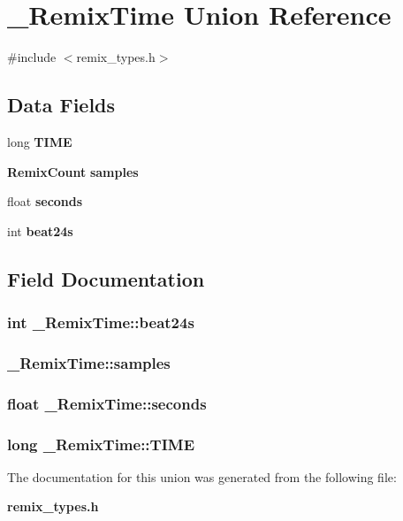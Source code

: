 \section{\_\-RemixTime Union Reference}
\label{union__RemixTime}


{\ttfamily \#include $<$remix\_\-types.h$>$}

\subsection*{Data Fields}
\begin{DoxyCompactItemize}
\item 
long {\bf TIME}
\item 
{\bf RemixCount} {\bf samples}
\item 
float {\bf seconds}
\item 
int {\bf beat24s}
\end{DoxyCompactItemize}


\subsection{Field Documentation}
\subsubsection[{beat24s}]{\setlength{\rightskip}{0pt plus 5cm}int {\bf \_\-RemixTime::beat24s}}\label{union__RemixTime_aac9cb0c3b6dfdb8ce53694543a690ee7}
\subsubsection[{samples}]{ {\bf \_\-RemixTime::samples}}\label{union__RemixTime_a99108dedfeaf35ef62d040ab4a68cbf8}
\subsubsection[{seconds}]{\setlength{\rightskip}{0pt plus 5cm}float {\bf \_\-RemixTime::seconds}}\label{union__RemixTime_acc6d5f9cd2847a68519973d39a2893e0}
\subsubsection[{TIME}]{\setlength{\rightskip}{0pt plus 5cm}long {\bf \_\-RemixTime::TIME}}\label{union__RemixTime_a07462fe824d8debcd53d74fd33cae24e}


The documentation for this union was generated from the following file:\begin{DoxyCompactItemize}
\item 
{\bf remix\_\-types.h}\end{DoxyCompactItemize}
